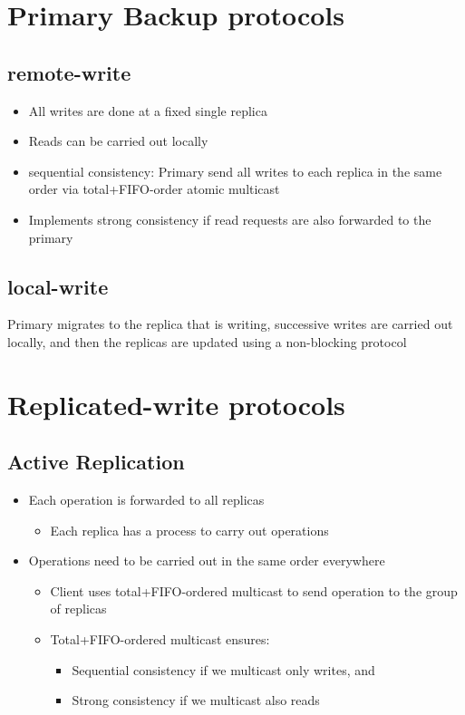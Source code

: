 \section{Primary Backup protocols}
\subsection{remote-write}
\begin{itemize}
    \item All writes are done at a fixed single replica
    \item Reads can be carried out locally
\end{itemize}
\begin{itemize}
    \item sequential consistency: Primary send all writes to each replica in the same order via total+FIFO-order atomic multicast
    \item Implements strong consistency if read requests are also forwarded to the primary
\end{itemize}
\subsection{local-write}
Primary migrates to the replica that is writing, successive writes are carried out locally, and then the replicas are updated using a non-blocking protocol
\section{Replicated-write protocols}
\subsection{Active Replication}
\begin{itemize}
  \item Each operation is forwarded to all replicas
  \begin{itemize}
    \item Each replica has a process to carry out operations
  \end{itemize}
  \item Operations need to be carried out in the same order everywhere
  \begin{itemize}
    \item Client uses total+FIFO-ordered multicast to send operation to the group of replicas
    \item Total+FIFO-ordered multicast ensures:
    \begin{itemize}
      \item Sequential consistency if we multicast only writes, and
      \item Strong consistency if we multicast also reads
    \end{itemize}
  \end{itemize}
\end{itemize}

